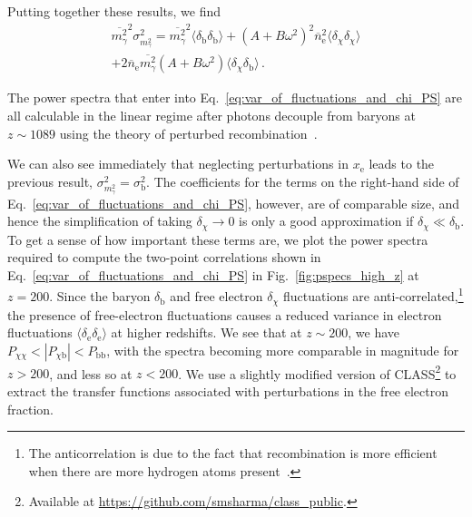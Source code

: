 \documentclass[prd,aps,10pt,nofootinbib,twocolumn,superscriptaddress,preprintnumbers,balancelastpage,longbibliography]{revtex4-1}
\begin{document}
%
Putting together these results, we find
%
\begin{multline}
    \overline{m_\gamma^2}^2 \sigma_{m_\gamma^2}^2 = \overline{m_\gamma^2}^2\langle \delta_\text{b} \delta_\text{b} \rangle + \left(A + B \omega^2\right)^2 \overline{n}_\text{e}^2 \langle \delta_\chi \delta_\chi \rangle \\ 
     + 2 \overline{n}_\text{e} \overline{m_\gamma^2} \left(A + B \omega^2 \right)\langle  \delta_\chi \delta_\text{b} \rangle \,.
    \label{eq:var_of_fluctuations_and_chi_PS}
\end{multline}
%

The power spectra that enter into Eq.~\eqref{eq:var_of_fluctuations_and_chi_PS} are all calculable in the linear regime after photons decouple from baryons at $z \sim 1089$ using the theory of perturbed recombination~\cite{Lewis:2007zh}.  

We can also see immediately that neglecting perturbations in $x_\text{e}$ leads to the previous result, $\sigma^2_{m_\gamma^2} = \sigma_\text{b}^2$. 
The coefficients for the terms on the right-hand side of Eq.~\eqref{eq:var_of_fluctuations_and_chi_PS}, however, are of comparable size, and hence the simplification of taking $\delta_\chi \to 0$ is only a good approximation if $\delta_\chi \ll \delta_\text{b}$. To get a sense of how important these terms are, we plot the power spectra required to compute the two-point correlations shown in Eq.~\eqref{eq:var_of_fluctuations_and_chi_PS} in Fig.~\ref{fig:pspecs_high_z} at $z=200$. Since the baryon $\delta_\text{b}$ and free electron $\delta_\chi$ fluctuations are anti-correlated,\footnote{The anticorrelation is due to the fact that recombination is more efficient when there are more hydrogen atoms present~\cite{Lewis:2007zh}.} the presence of free-electron fluctuations causes a reduced variance in electron fluctuations $\langle \delta_\text{e} \delta_\text{e} \rangle$ at higher redshifts. We see that at $z \sim 200$, we have $P_{\chi \chi} < |P_{\chi \text{b}}| < P_\text{bb}$, with the spectra becoming more comparable in magnitude for $z > 200$, and less so at $z < 200$. We use a slightly modified version of CLASS\footnote{Available at \url{https://github.com/smsharma/class_public}.} to extract the transfer functions associated with perturbations in the free electron fraction.
\end{document}
